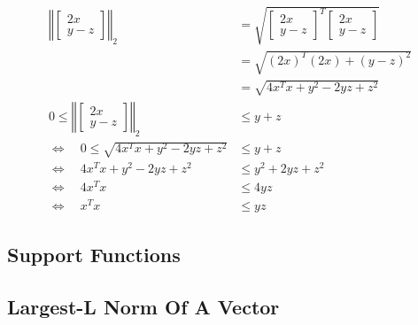 \begin{align*}
    \left\Vert\begin{bmatrix}
        2x \\
        y - z
    \end{bmatrix}\right\Vert_2 &= \sqrt{\begin{bmatrix}
        2x \\
        y - z
    \end{bmatrix}^T \begin{bmatrix}
        2x \\
        y - z
    \end{bmatrix}} \\
    &= \sqrt{(2x)^T(2x) + (y-z)^2} \\
    &= \sqrt{4x^T x + y^2 - 2yz + z^2} \\
    0 \le \left\Vert\begin{bmatrix}
        2x \\
        y - z
    \end{bmatrix}\right\Vert_2 &\le y + z \\
    \Leftrightarrow \quad 0 \le \sqrt{4x^T x + y^2 - 2yz + z^2} &\le y + z \\
    \Leftrightarrow \quad 4x^T x + y^2 - 2yz + z^2 &\le y^2 + 2yz + z^2 \\
    \Leftrightarrow \quad 4x^T x &\le 4yz \\
    \Leftrightarrow \quad x^T x &\le yz
\end{align*}

\subsection{Support Functions}
\subsection{Largest-L Norm Of A Vector}
